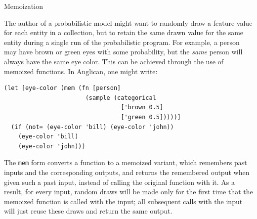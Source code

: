 \documentclass[preprint]{sigplanconf}
\begin{document}
\iftoggle{full}{%
\smallskip
\begin{center}
*\qquad*\qquad*
\end{center}

In addition to \texttt{sample} and \texttt{observe}, there are a few other special
forms ---  \texttt{store}, \texttt{retrieve}, \texttt{mem} ---
which modify program state. These forms are translated into
expressions involving calls of functions from the
\texttt{anglican.state} namespace. The \texttt{mem} form, which
implements memoization, deserves a more detailed explanation.
}{%
}%

\iftoggle{full}{\subsubsection }{\subsection}{Memoization}
\label{sec:mem}

The author of a probabilistic model might want to 
randomly draw a feature value for each entity in a collection,
but to retain the same drawn
value for the same entity during a single run of the probabilistic
program. For example, a person may have brown or green eyes
with some probability, but the \textit{same} person will
always have the same eye color. This can be achieved
through the use of memoized functions. In Anglican, one
might write:
\begin{lstlisting}[style=default]
(let [eye-color (mem (fn [person]
                       (sample (categorical
                                 ['brown 0.5]
                                 ['green 0.5]))))]
  (if (not= (eye-color 'bill) (eye-color 'john))
    (eye-color 'bill)
    (eye-color 'john)))
\end{lstlisting}
The \texttt{mem} form converts a function to a memoized variant,
which remembers past inputs and the corresponding outputs, and 
returns the remembered output when given such a past input, 
instead of calling the original function with it. As a result,
for every input, random draws will be made only for the first time 
that the memoized function is called with the input; all subsequent
calls with the input will just reuse these draws and return the same output.
\end{document}
